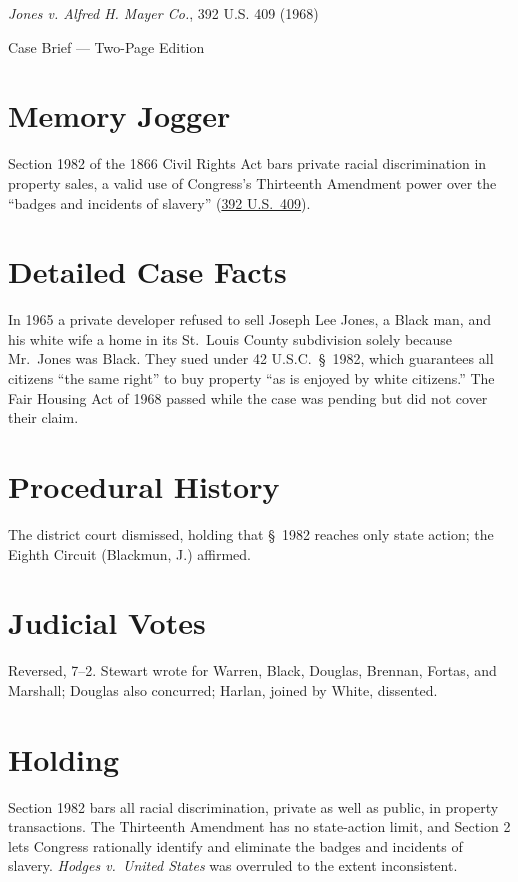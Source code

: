 \documentclass[12pt]{article}
\begin{document}
\begin{center}
{\LARGE \textit{Jones v. Alfred H. Mayer Co.}, 392 U.S. 409 (1968)\par}
\vspace{0.5em}
{\large Case Brief --- Two-Page Edition\par}
\end{center}

\section{Memory Jogger}
Section 1982 of the 1866 Civil Rights Act bars private racial discrimination in property sales, a valid use of Congress's Thirteenth Amendment power over the ``badges and incidents of slavery'' (\href{https://supreme.justia.com/cases/federal/us/392/409/}{392 U.S.\ 409}).

\section{Detailed Case Facts}
In 1965 a private developer refused to sell Joseph Lee Jones, a Black man, and his white wife a home in its St.\ Louis County subdivision solely because Mr.\ Jones was Black. They sued under 42 U.S.C.\ \S\ 1982, which guarantees all citizens ``the same right'' to buy property ``as is enjoyed by white citizens.'' The Fair Housing Act of 1968 passed while the case was pending but did not cover their claim.

\section{Procedural History}
The district court dismissed, holding that \S\ 1982 reaches only state action; the Eighth Circuit (Blackmun, J.) affirmed.

\section{Judicial Votes}
Reversed, 7--2. Stewart wrote for Warren, Black, Douglas, Brennan, Fortas, and Marshall; Douglas also concurred; Harlan, joined by White, dissented.

\section{Holding}
Section 1982 bars all racial discrimination, private as well as public, in property transactions. The Thirteenth Amendment has no state-action limit, and Section 2 lets Congress rationally identify and eliminate the badges and incidents of slavery. \textit{Hodges v.\ United States} was overruled to the extent inconsistent.
\end{document}
